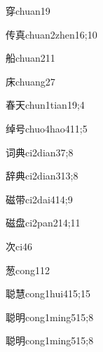 \begin{verbete}{穿}{chuan1}{9}
\end{verbete}
\begin{verbete}{传真}{chuan2zhen1}{6;10}
\end{verbete}
\begin{verbete}{船}{chuan2}{11}
\end{verbete}
\begin{verbete}{床}{chuang2}{7}
\end{verbete}
\begin{verbete}{春天}{chun1tian1}{9;4}
\end{verbete}
\begin{verbete}{绰号}{chuo4hao4}{11;5}
\end{verbete}
\begin{verbete}{词典}{ci2dian3}{7;8}
\end{verbete}
\begin{verbete}{辞典}{ci2dian3}{13;8}
\end{verbete}
\begin{verbete}{磁带}{ci2dai4}{14;9}
\end{verbete}
\begin{verbete}{磁盘}{ci2pan2}{14;11}
\end{verbete}
\begin{verbete}{次}{ci4}{6}
\end{verbete}
\begin{verbete}{葱}{cong1}{12}
\end{verbete}
\begin{verbete}{聪慧}{cong1hui4}{15;15}
\end{verbete}
\begin{verbete}{聪明}{cong1ming5}{15;8}
\end{verbete}
\begin{verbete}{聪明}{cong1ming5}{15;8}
\end{verbete}
